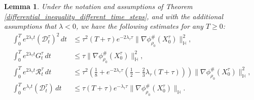\documentclass[10pt,a4paper]{amsart}
\newtheorem{lemma}{Lemma}
\begin{document}
\begin{lemma} \label{estimates_lambda_negative}
Under the notation and assumptions of Theorem \ref{differential_inequality_different_time_steps}, and with the additional assumptions that $\lambda < 0$, we have the following estimates for any $T \geq 0$:
\begin{equation}
\begin{aligned}
    \int_0^T e^{2 \lambda_{\tau} t} (\mathcal{D}_t^{\tau})^2 \,dt 
    &\leq \tau^2 (T+\tau) e^{-2 \lambda_{\tau} \tau} \|\nabla \phi^{\#}_{\rho_0}(X_0^{\tau})\|^2_{\mathbb{H}},  
    \label{distance_squared_bound} \\
    \int_0^T e^{2 \lambda_{\tau} t} G_t^{\tau} \,dt 
    &\leq \tau \|\nabla \phi^{\#}_{\rho_0}(X_0^{\tau})\|^2_{\mathbb{H}}, \\
    \int_0^T e^{2 \lambda_{\tau} t} \mathcal{R}^{\tau}_t \,dt 
    &\leq \tau^2\left( \frac{1}{8} + e^{-2 \lambda_{\tau} \tau} \left( \frac{1}{2} - \frac{2}{3} \lambda_{\tau}(T+\tau) \right) \right) 
    \|\nabla \phi^{\#}_{\rho_0}(X^{\tau}_0)\|^2_{\mathbb{H}}, \\ 
    \int_0^T e^{\lambda_{\tau} t} (\mathcal{D}_t^{\tau}) \,dt 
    &\leq \tau (T+\tau) e^{-\lambda_{\tau} \tau} \|\nabla \phi^{\#}_{\rho_0}(X_0^{\tau})\|_{\mathbb{H}}.
\end{aligned}
\end{equation}

\end{lemma}
\end{document}
